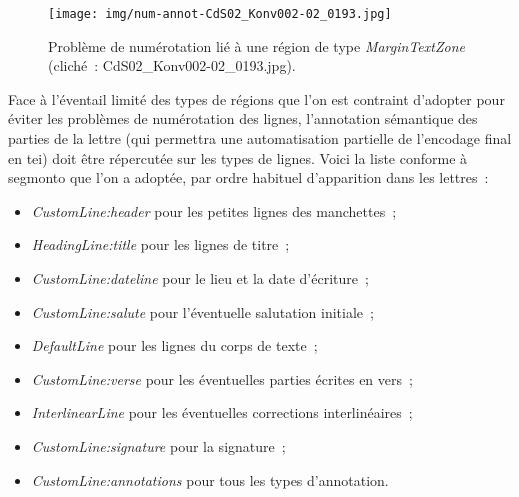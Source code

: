 \documentclass[a4paper,12pt,twoside]{book}
\begin{document}
				\begin{figure}[!h]
					\centering
					\texttt{[image: img/num-annot-CdS02\_Konv002-02\_0193.jpg]}
					\caption{Problème de numérotation lié à une région de type \textit{MarginTextZone} (cliché~: CdS02\_Konv002-02\_0193.jpg).}
					\label{num-annot-193}
				\end{figure}
				
				Face à l'éventail limité des types de régions que l'on est contraint d'adopter pour éviter les problèmes de numérotation des lignes, l'annotation sémantique des parties de la lettre (qui permettra une automatisation partielle de l'encodage final en \gls{tei}) doit être répercutée sur les types de lignes. Voici la liste conforme à \gls{segmonto} que l'on a adoptée, par ordre habituel d'apparition dans les lettres~:
				
				\begin{itemize}
					\item \textit{CustomLine:header} pour les petites lignes des manchettes~;
					\item \textit{HeadingLine:title} pour les lignes de titre~;
					\item \textit{CustomLine:dateline} pour le lieu et la date d'écriture~;
					\item \textit{CustomLine:salute} pour l'éventuelle salutation initiale~;
					\item \textit{DefaultLine} pour les lignes du corps de texte~;
					\item \textit{CustomLine:verse} pour les éventuelles parties écrites en vers~;
					\item \textit{InterlinearLine} pour les éventuelles corrections interlinéaires~;\label{interlinear}
					\item \textit{CustomLine:signature} pour la signature~;
					\item \textit{CustomLine:annotations} pour tous les types d'annotation.
				\end{itemize}
		
\end{document}
